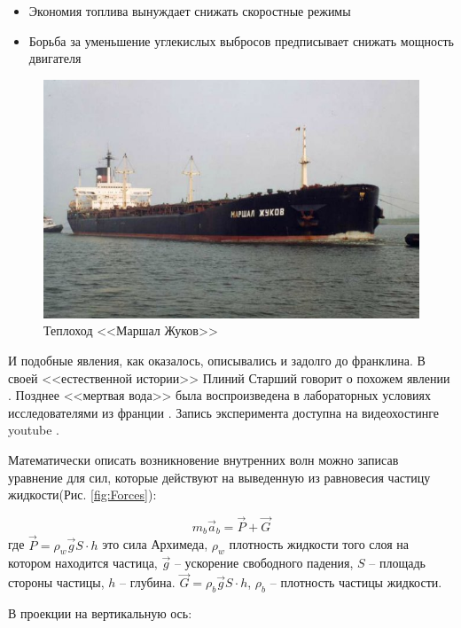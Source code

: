 \begin{itemize}
    \item Экономия топлива вынуждает снижать скоростные режимы
    \item Борьба за уменьшение углекислых выбросов предписывает снижать мощность двигателя
\end{itemize}


\begin{figure}
    \centering
    \includegraphics[scale=0.5]{Figs/marshl_jukov.jpg}
    \caption{Теплоход <<Маршал Жуков>>}
    \label{fig:jukov}
\end{figure}

И подобные явления, как оказалось, описывались и задолго до франклина. В своей <<естественной истории>> Плиний Старший говорит о похожем явлении \cite{Plinii}. Позднее <<мертвая вода>> была воспроизведена в лабораторных условиях исследователями из франции \cite{deadWater}. Запись эксперимента доступна на видеохостинге youtube \cite{deadWaterVideo}.


Математически описать возникновение внутренних волн можно записав уравнение для сил, которые действуют на выведенную из равновесия частицу жидкости(Рис. \ref{fig:Forces}):

\begin{equation}
    m_b \vec{a}_b = \vec{P} + \vec{G}
\end{equation}
где $\vec{P}=\rho_w \vec{g} S \cdot h$ это сила Архимеда, $\rho_w$ плотность жидкости того слоя на котором находится частица, $\vec{g}$ -- ускорение свободного падения, $S$ -- площадь стороны частицы, $h$  -- глубина. $\vec{G} = \rho_b \vec{g} S \cdot h$,  $\rho_b$ -- плотность частицы жидкости.

В проекции на вертикальную ось:

